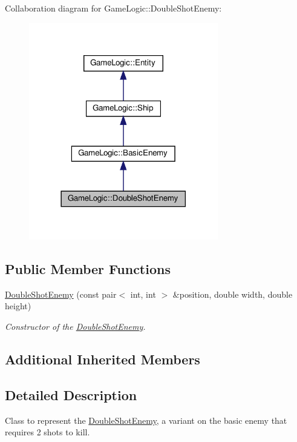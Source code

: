Collaboration diagram for Game\+Logic\+:\+:Double\+Shot\+Enemy\+:\nopagebreak
\begin{figure}[H]
\begin{center}
\leavevmode
\includegraphics[width=234pt]{classGameLogic_1_1DoubleShotEnemy__coll__graph}
\end{center}
\end{figure}
\subsection*{Public Member Functions}
\begin{DoxyCompactItemize}
\item 
\hyperlink{classGameLogic_1_1DoubleShotEnemy_af5fc1cc7366c88a37696e3f8640ee88f}{Double\+Shot\+Enemy} (const pair$<$ int, int $>$ \&position, double width, double height)
\begin{DoxyCompactList}\small\item\em Constructor of the \hyperlink{classGameLogic_1_1DoubleShotEnemy}{Double\+Shot\+Enemy}. \end{DoxyCompactList}\end{DoxyCompactItemize}
\subsection*{Additional Inherited Members}


\subsection{Detailed Description}
Class to represent the \hyperlink{classGameLogic_1_1DoubleShotEnemy}{Double\+Shot\+Enemy}, a variant on the basic enemy that requires 2 shots to kill. 

